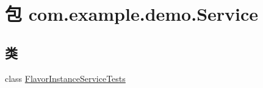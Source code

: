 \hypertarget{namespacecom_1_1example_1_1demo_1_1_service}{}\section{包 com.\+example.\+demo.\+Service}
\label{namespacecom_1_1example_1_1demo_1_1_service}
\subsection*{类}
\begin{DoxyCompactItemize}
\item 
class \mbox{\hyperlink{classcom_1_1example_1_1demo_1_1_service_1_1_flavor_instance_service_tests}{Flavor\+Instance\+Service\+Tests}}
\end{DoxyCompactItemize}
